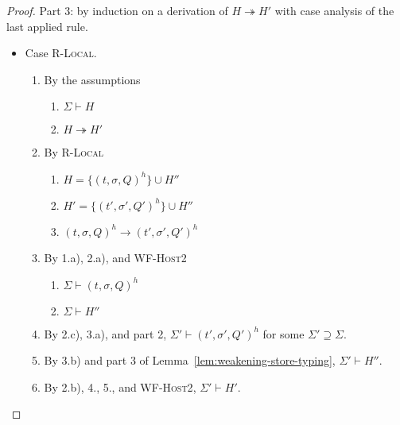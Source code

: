 \documentclass{article}
\theoremstyle{definition}
\begin{document}
\begin{proof}
Part 3: by induction on a derivation of $H \twoheadrightarrow H'$ with case analysis of the last applied rule.

\begin{itemize}
\item Case \textsc{R-Local}.
\begin{enumerate}
\item By the assumptions
  \begin{enumerate}[label=(\alph*)]
  \item $\Sigma \vdash H$
  \item $H \twoheadrightarrow H'$
  \end{enumerate}
\item By \textsc{R-Local}
  \begin{enumerate}[label=(\alph*)]
  \item $H = \{ (t, \sigma, Q)^h \} \cup H''$
  \item $H' = \{ (t', \sigma', Q')^h \} \cup H''$
  \item $(t, \sigma, Q)^h \longrightarrow (t', \sigma', Q')^h$
  \end{enumerate}
\item By 1.a), 2.a), and \textsc{WF-Host2}
  \begin{enumerate}[label=(\alph*)]
  \item $\Sigma \vdash (t, \sigma, Q)^h$
  \item $\Sigma \vdash H''$
  \end{enumerate}
\item By 2.c), 3.a), and part 2, $\Sigma' \vdash (t', \sigma', Q')^h$ for some $\Sigma' \supseteq \Sigma$.
\item By 3.b) and part 3 of Lemma~\ref{lem:weakening-store-typing}, $\Sigma' \vdash H''$.
\item By 2.b), 4., 5., and \textsc{WF-Host2}, $\Sigma' \vdash H'$.
\end{enumerate}


\end{itemize}
\end{proof}
\end{document}
